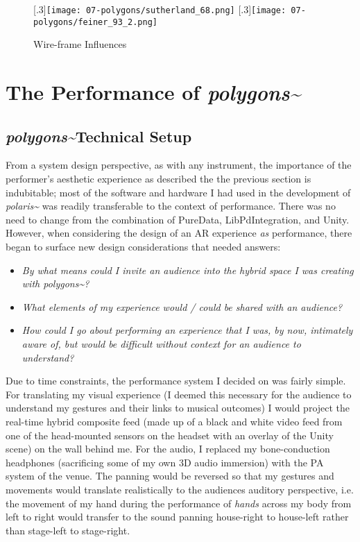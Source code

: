 \begin{figure}
    \centering
    [.3\linewidth]{\texttt{[image: 07-polygons/sutherland\_68.png]}}
    [.3\linewidth]{\texttt{[image: 07-polygons/feiner\_93\_2.png]}}%
    \caption{Wire-frame Influences}
    \label{fig: polygons-wireframes}
\end{figure}


\section{The Performance of \textit{polygons\textasciitilde{}}} \label{sec: polygons-performances}
\subsection{\textit{polygons\textasciitilde{}}Technical Setup} \label{sec: polygons-performances-setup}
From a system design perspective, as with any instrument, the importance of the performer's aesthetic experience as described the the previous section is indubitable; most of the software and hardware I had used in the development of \textit{polaris\textasciitilde{}} was readily transferable to the context of performance. There was no need to change from the combination of PureData, LibPdIntegration, and Unity. However, when considering the design of an AR experience \textit{as} performance, there began to surface new design considerations that needed answers:
\begin{itemize}
    \item \textit{By what means could I invite an audience into the hybrid space I was creating with \textit{polygons\textasciitilde{}}?} 
    \item \textit{What elements of my experience would / could be shared with an audience?} 
    \item \textit{How could I go about performing an experience that I was, by now, intimately aware of, but would be difficult without context for an audience to understand?} 
\end{itemize}
Due to time constraints, the performance system I decided on was fairly simple. For translating my visual experience (I deemed this necessary for the audience to understand my gestures and their links to musical outcomes) I would project the real-time hybrid composite feed (made up of a black and white video feed from one of the head-mounted sensors on the headset with an overlay of the Unity scene) on the wall behind me. For the audio, I replaced my bone-conduction headphones (sacrificing some of my own 3D audio immersion) with the PA system of the venue. The panning would be reversed so that my gestures and movements would translate realistically to the audiences auditory perspective, i.e. the movement of my hand during the performance of \textit{hands} across my body from left to right would transfer to the sound panning house-right to house-left rather than stage-left to stage-right.

